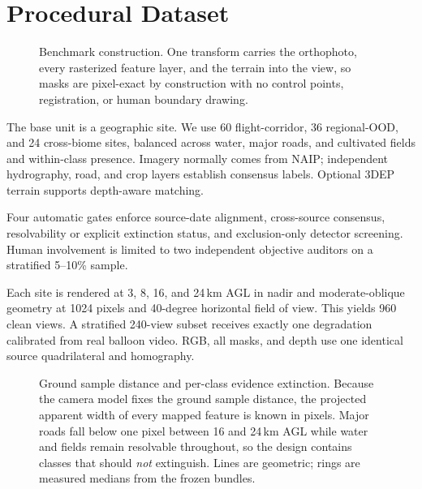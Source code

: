 \section{Procedural Dataset}

\begin{figure}[t]
  \centering
  \caption{Benchmark construction. One transform carries the orthophoto, every
  rasterized feature layer, and the terrain into the view, so masks are
  pixel-exact by construction with no control points, registration, or human
  boundary drawing.}
  \label{fig:construction}
\end{figure}

The base unit is a geographic site. We use 60 flight-corridor, 36 regional-OOD,
and 24 cross-biome sites, balanced across water, major roads, and cultivated
fields and within-class presence. Imagery normally comes from NAIP; independent
hydrography, road, and crop layers establish consensus labels. Optional 3DEP
terrain supports depth-aware matching.

Four automatic gates enforce source-date alignment, cross-source consensus,
resolvability or explicit extinction status, and exclusion-only detector
screening. Human involvement is limited to two independent objective auditors
on a stratified 5--10\% sample.

Each site is rendered at 3, 8, 16, and 24\,km AGL in nadir and moderate-oblique
geometry at 1024 pixels and 40-degree horizontal field of view. This yields 960
clean views. A stratified 240-view subset receives exactly one degradation
calibrated from real balloon video. RGB, all masks, and depth use one identical
source quadrilateral and homography.

\begin{figure}[t]
  \centering
  \caption{Ground sample distance and per-class evidence extinction. Because the
  camera model fixes the ground sample distance, the projected apparent width of
  every mapped feature is known in pixels. Major roads fall below one pixel
  between 16 and 24\,km AGL while water and fields remain resolvable throughout,
  so the design contains classes that should \emph{not} extinguish. Lines are
  geometric; rings are measured medians from the frozen bundles.}
  \label{fig:extinction}
\end{figure}

